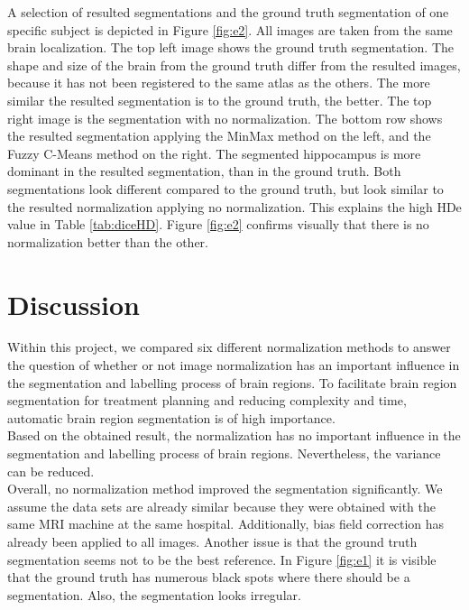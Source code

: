 \documentclass[article]{IEEEtran}
\begin{document}
\begin{multicols}{2}

	A selection of resulted segmentations and the ground truth segmentation of one specific subject is depicted in Figure \ref{fig:e2}.
	All images are taken from the same brain localization.
	The top left image shows the ground truth segmentation. 
	The shape and size of the brain from the ground truth differ from the resulted images, because it has not been registered to the same atlas as the others.
	The more similar the resulted segmentation is to the ground truth, the better.
	The top right image is the segmentation with no normalization.
	The bottom row shows the resulted segmentation applying the MinMax method on the left, and the Fuzzy C-Means method on the right. 
	The segmented hippocampus is more dominant in the resulted segmentation, than in the ground truth.
	Both segmentations look different compared to the ground truth, but look similar to the resulted normalization applying no normalization. 
	This explains the high HDe value in Table \ref{tab:diceHD}. 
	Figure \ref{fig:e2} confirms visually that there is no normalization better than the other.
	




\section{Discussion}
	Within this project, we compared six different normalization methods to answer the question of whether or not image normalization has an important influence in the segmentation and labelling process of brain regions.
	To facilitate brain region segmentation for treatment planning and reducing complexity and time, automatic brain region segmentation is of high importance. \\
	
	Based on the obtained result, the normalization has no important influence in the segmentation and labelling process of brain regions. 
	Nevertheless, the variance can be reduced. \\
	
	Overall, no normalization method improved the segmentation significantly.
	We assume the data sets are already similar because they were obtained with the same MRI machine at the same hospital. 
	Additionally, bias field correction has already been applied to all images. 
	Another issue is that the ground truth segmentation seems not to be the best reference. 
	In Figure \ref{fig:e1} it is visible that the ground truth has numerous black spots where there should be a segmentation. Also, the segmentation looks irregular.\\
	

\end{multicols}
\end{document}
